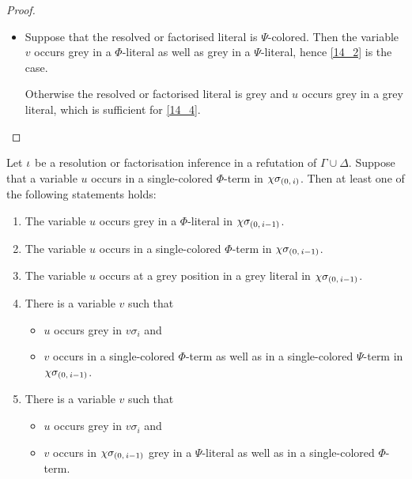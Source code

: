 \documentclass[,%
	draft=false,%
	numbers=noendperiod
	12pt,
	a4paper,
	oneside,%
	openany,
]{memoir}
\newcommand{\inv}{\ensuremath{\chi}}
\begin{document}
\begin{proof}
\begin{itemize}
\begin{itemize}
\begin{itemize}
						\item Suppose that the resolved or factorised literal is $\Psi$-colored.
							Then the variable $v$ occurs grey in a $\Phi$-literal as well as grey in a $\Psi$-literal, hence \ref{14_2} is the case.

							Otherwise the resolved or factorised literal is grey and $u$ occurs grey in a grey literal, which is sufficient for \ref{14_4}.
							\qedhere
					\end{itemize}

			\end{itemize}

	\end{itemize}

\end{proof}

\begin{lemma}
	\label{lemma:var_in_sc_term}
	Let $\iota$ be a resolution or factorisation inference in a refutation of $\Gamma\cup\Delta$.
	Suppose that a variable $u$ occurs in a single-colored $\Phi$-term in $\inv\sigmazi$.
	Then at least one of the following statements holds:
	\begin{enumerate}
		\item
			\label{15_3}
			The variable $u$ occurs grey in a $\Phi$-literal in $\inv\sigmazmi$.

		\item
			\label{15_1}
			The variable $u$ occurs in a single-colored $\Phi$-term in $\inv\sigmazmi$.

		\item
			\label{15_5}
			The variable $u$ occurs at a grey position in a grey literal in $\inv\sigmazmi$.

		\item
			\label{15_2}
			There is a variable $v$ such that 
			{
				\renewcommand{\labelitemi}{\textendash}
				\begin{itemize}
					\item $u$ occurs grey in $v\sigma_i$ and
					\item
						$v$ occurs in a single-colored $\Phi$-term as well as in a single-colored $\Psi$-term in $\inv\sigmazmi$.
				\end{itemize}
			}


		\item
			\label{15_4}
			There is a variable $v$ such that 

			{
				\renewcommand{\labelitemi}{\textendash}
				\begin{itemize}
					\item $u$ occurs grey in $v\sigma_i$ and
					\item
						$v$ occurs in $\inv\sigmazmi$
						grey in a $\Psi$-literal as well as in a single-colored $\Phi$-term.
				\end{itemize}
			}


	\end{enumerate}
\end{lemma}
\end{document}
